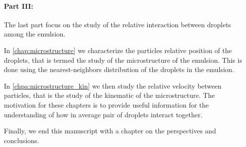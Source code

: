 \paragraph*{Part III:} 
The last part  focus on the study of the relative interaction between droplets among the emulsion. 


In \ref{chap:microstructure} we characterize the particles relative position of the droplets, that is termed the study of the microstructure of the emulsion. 
This is done using the nearest-neighbors distribution of the droplets in the emulsion. 

In \ref{chpa:microstructure_kin} we then study the relative velocity between particles, that is the study of the kinematic of the microstructure. 
The motivation for these  chapters is to provide useful information for the understanding of how in average pair of droplets interact together. 




Finally, we end this manuscript with a chapter on the perspectives and conclusions. 